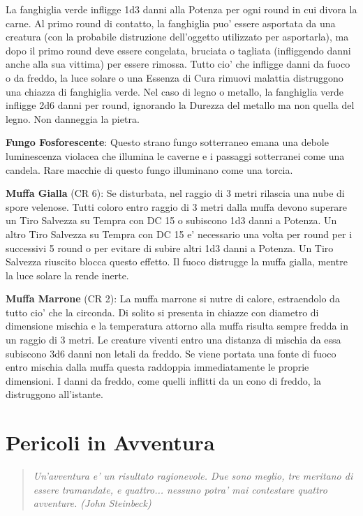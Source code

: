 \documentclass[a4paper,11pt,twoside,openany]{book}
\begin{document}
{		La fanghiglia verde infligge 1d3 danni alla Potenza per ogni round in cui divora la carne. Al primo round di contatto, la fanghiglia puo' essere asportata da una creatura (con la probabile distruzione dell'oggetto utilizzato per asportarla), ma dopo il primo round deve essere congelata, bruciata o tagliata (infliggendo danni anche alla sua vittima) per essere rimossa. Tutto cio' che infligge danni da fuoco o da freddo, la luce solare o una Essenza di Cura rimuovi malattia distruggono una chiazza di fanghiglia verde. Nel caso di legno o metallo, la fanghiglia verde infligge 2d6 danni per round, ignorando la Durezza del metallo ma non quella del legno. Non danneggia la pietra.
		
		\textbf{Fungo Fosforescente}: Questo strano fungo sotterraneo emana una debole luminescenza violacea che illumina le caverne e i passaggi sotterranei come una candela. Rare macchie di questo fungo illuminano come una torcia.
		
		\textbf{Muffa Gialla} (CR 6): Se disturbata, nel raggio di 3 metri rilascia una nube di spore velenose. Tutti coloro entro raggio di 3 metri dalla muffa devono superare un Tiro Salvezza su Tempra con DC 15 o subiscono 1d3 danni a Potenza. Un altro Tiro Salvezza su Tempra con DC 15 e' necessario una volta per round per i successivi 5 round o per evitare di subire altri 1d3 danni a Potenza. Un Tiro Salvezza riuscito blocca questo effetto. Il fuoco distrugge la muffa gialla, mentre la luce solare la rende inerte.
		
		\textbf{Muffa Marrone} (CR 2): La muffa marrone si nutre di calore, estraendolo da tutto cio' che la circonda. Di solito si presenta in chiazze con diametro di dimensione mischia e la temperatura attorno alla muffa risulta sempre fredda in un raggio di 3 metri. Le creature viventi entro una distanza di mischia da essa subiscono 3d6 danni non letali da freddo. Se viene portata una fonte di fuoco entro mischia dalla muffa questa raddoppia immediatamente le proprie dimensioni. I danni da freddo, come quelli inflitti da un cono di freddo, la distruggono all'istante.
		
		\pagebreak
		
		\section{Pericoli in Avventura}
		
		
		\begin{quote}\textit{
				{Un'avventura e' un risultato ragionevole. Due sono meglio, tre meritano di essere tramandate, e quattro... nessuno potra' mai contestare quattro avventure. (John Steinbeck)}
		}\end{quote}
		
}
\end{document}
